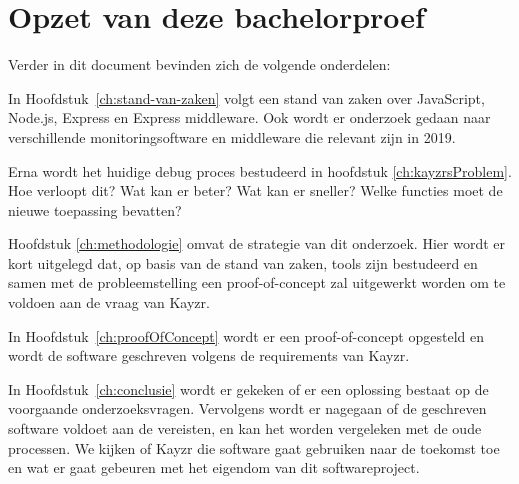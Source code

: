 \section{Opzet van deze bachelorproef}
\label{sec:opzet-bachelorproef}


Verder in dit document bevinden zich de volgende onderdelen:

In Hoofdstuk~\ref{ch:stand-van-zaken} volgt een stand van zaken over JavaScript, Node.js, Express en Express middleware. Ook wordt er onderzoek gedaan naar verschillende monitoringsoftware en middleware die relevant zijn in 2019.

Erna wordt het huidige debug proces bestudeerd in hoofdstuk \ref{ch:kayzrsProblem}. Hoe verloopt dit? Wat kan er beter? Wat kan er sneller? Welke functies moet de nieuwe toepassing bevatten?

Hoofdstuk \ref{ch:methodologie} omvat de strategie van dit onderzoek. Hier wordt er kort uitgelegd dat, op basis van de stand van zaken, tools zijn bestudeerd en samen met de probleemstelling een proof-of-concept zal uitgewerkt worden om te voldoen aan de vraag van Kayzr.

In Hoofdstuk~\ref{ch:proofOfConcept} wordt er een proof-of-concept opgesteld en wordt de software geschreven volgens de requirements van Kayzr.

In Hoofdstuk~\ref{ch:conclusie} wordt er gekeken of er een oplossing bestaat op de voorgaande onderzoeksvragen. Vervolgens wordt er nagegaan of de geschreven software voldoet aan de vereisten, en kan het worden vergeleken met de oude processen. We kijken of Kayzr die software gaat gebruiken naar de toekomst toe en wat er gaat gebeuren met het eigendom van dit softwareproject.

